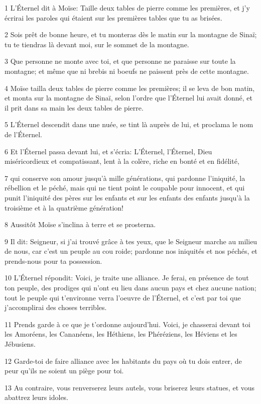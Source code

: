\par 1 L'Éternel dit à Moïse: Taille deux tables de pierre comme les premières, et j'y écrirai les paroles qui étaient sur les premières tables que tu as brisées.
\par 2 Sois prêt de bonne heure, et tu monteras dès le matin sur la montagne de Sinaï; tu te tiendras là devant moi, sur le sommet de la montagne.
\par 3 Que personne ne monte avec toi, et que personne ne paraisse sur toute la montagne; et même que ni brebis ni boeufs ne paissent près de cette montagne.
\par 4 Moïse tailla deux tables de pierre comme les premières; il se leva de bon matin, et monta sur la montagne de Sinaï, selon l'ordre que l'Éternel lui avait donné, et il prit dans sa main les deux tables de pierre.
\par 5 L'Éternel descendit dans une nuée, se tint là auprès de lui, et proclama le nom de l'Éternel.
\par 6 Et l'Éternel passa devant lui, et s'écria: L'Éternel, l'Éternel, Dieu miséricordieux et compatissant, lent à la colère, riche en bonté et en fidélité,
\par 7 qui conserve son amour jusqu'à mille générations, qui pardonne l'iniquité, la rébellion et le péché, mais qui ne tient point le coupable pour innocent, et qui punit l'iniquité des pères sur les enfants et sur les enfants des enfants jusqu'à la troisième et à la quatrième génération!
\par 8 Aussitôt Moïse s'inclina à terre et se prosterna.
\par 9 Il dit: Seigneur, si j'ai trouvé grâce à tes yeux, que le Seigneur marche au milieu de nous, car c'est un peuple au cou roide; pardonne nos iniquités et nos péchés, et prends-nous pour ta possession.
\par 10 L'Éternel répondit: Voici, je traite une alliance. Je ferai, en présence de tout ton peuple, des prodiges qui n'ont eu lieu dans aucun pays et chez aucune nation; tout le peuple qui t'environne verra l'oeuvre de l'Éternel, et c'est par toi que j'accomplirai des choses terribles.
\par 11 Prends garde à ce que je t'ordonne aujourd'hui. Voici, je chasserai devant toi les Amoréens, les Cananéens, les Héthiens, les Phéréziens, les Héviens et les Jébusiens.
\par 12 Garde-toi de faire alliance avec les habitants du pays où tu dois entrer, de peur qu'ils ne soient un piège pour toi.
\par 13 Au contraire, vous renverserez leurs autels, vous briserez leurs statues, et vous abattrez leurs idoles.
